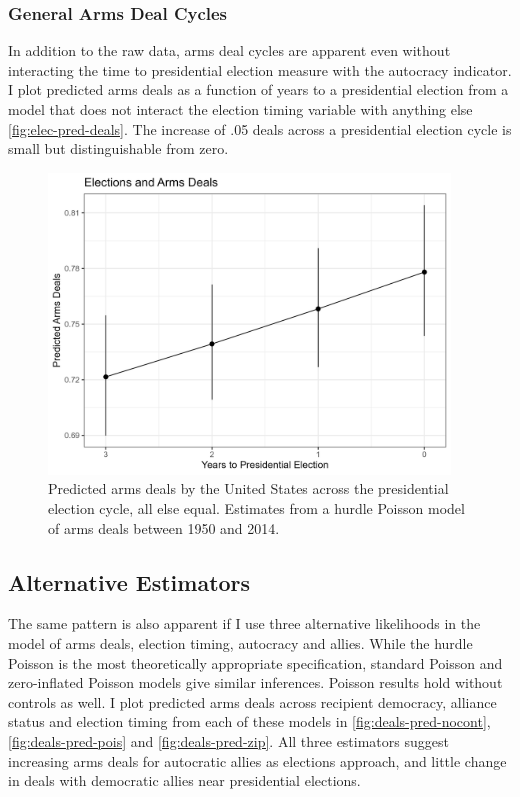 \documentclass[12pt]{article}
\begin{document}
\subsubsection{General Arms Deal Cycles}

In addition to the raw data, arms deal cycles are apparent even without interacting the time to presidential election measure with the autocracy indicator.
I plot predicted arms deals as a function of years to a presidential election from a model that does not interact the election timing variable with anything else \autoref{fig:elec-pred-deals}. 
The increase of .05 deals across a presidential election cycle is small but distinguishable from zero. 


\begin{figure}[htpb]
	\centering
		\includegraphics[width=0.95\textwidth]{elec-pred-deals.png}
	\caption{Predicted arms deals by the United States across the presidential election cycle, all else equal. Estimates from a hurdle Poisson model of arms deals between 1950 and 2014. }
	\label{fig:elec-pred-deals}
\end{figure}



\subsection{Alternative Estimators}


The same pattern is also apparent if I use three alternative likelihoods in the model of arms deals, election timing, autocracy and allies. 
While the hurdle Poisson is the most theoretically appropriate specification, standard Poisson and zero-inflated Poisson models give similar inferences.
Poisson results hold without controls as well.
I plot predicted arms deals across recipient democracy, alliance status and election timing from each of these models in \autoref{fig:deals-pred-nocont}, \autoref{fig:deals-pred-pois} and \autoref{fig:deals-pred-zip}. 
All three estimators suggest increasing arms deals for autocratic allies as elections approach, and little change in deals with democratic allies near presidential elections. 
\end{document}
